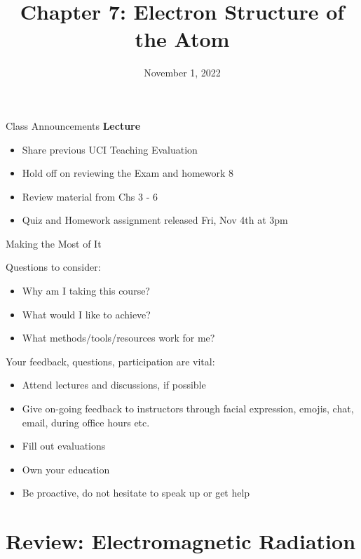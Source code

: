 \documentclass[11pt]{beamer}
\title{Chapter 7: Electron Structure of the Atom}
\institute{Chemistry Department, Cypress College}
\date{November 1, 2022}
\begin{document}
\begin{frame}
  \titlepage
\end{frame}

\begin{frame}{Class Announcements}
  \textbf{Lecture}
  \begin{itemize}
  \item Share previous UCI Teaching Evaluation
  \item Hold off on reviewing the Exam and homework 8
  \item Review material from Chs 3 - 6
  \item Quiz and Homework assignment released Fri, Nov 4th at 3pm
  \end{itemize}
\end{frame}

\begin{frame}{Making the Most of It}

  Questions to consider:
  \begin{itemize}
  \item Why am I taking this course?
  \item What would I like to achieve?
  \item What methods/tools/resources work for me?
  \end{itemize}

  Your feedback, questions, participation are vital:
  \begin{itemize}
  \item Attend lectures and discussions, if possible
  \item Give on-going feedback to instructors through facial expression,
    emojis, chat, email, during office hours etc.
  \item Fill out evaluations
  \item Own your education
  \item Be proactive, do not hesitate to speak up or get help
  \end{itemize}

\end{frame}

\section{Review: Electromagnetic Radiation}
\end{document}
